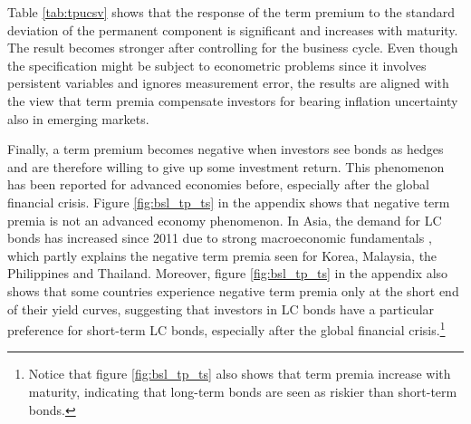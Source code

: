 {Table \ref{tab:tpucsv} shows that the response of the term premium to the standard deviation of the permanent component is significant %
and increases with maturity.
The result becomes stronger after controlling for the business cycle. 
Even though the specification might be subject to econometric problems since it involves persistent variables and ignores measurement error,
the results are %
aligned with the view that term premia compensate investors for bearing inflation uncertainty also in emerging markets.




Finally, a term premium becomes negative when investors see bonds as hedges and are therefore willing to give up some investment return. 
This phenomenon has been reported for advanced economies before, especially after the global financial crisis.
Figure \ref{fig:bsl_tp_ts} in the appendix shows that negative term premia is not an advanced economy phenomenon.
In Asia, the demand for LC bonds has increased since 2011 due to strong macroeconomic fundamentals \citep{IMFWB:2020}, which partly explains the negative term premia seen for Korea, Malaysia, the Philippines and Thailand.
Moreover,
figure \ref{fig:bsl_tp_ts} in the appendix also shows that some countries experience negative term premia only at the short end of their yield curves, %
suggesting that %
investors in LC bonds %
have a particular preference for short-term LC bonds, especially after the global financial crisis.\footnote{ Notice that figure \ref{fig:bsl_tp_ts} also shows that term premia increase with maturity, indicating that long-term bonds are seen as riskier than short-term bonds.}

}

